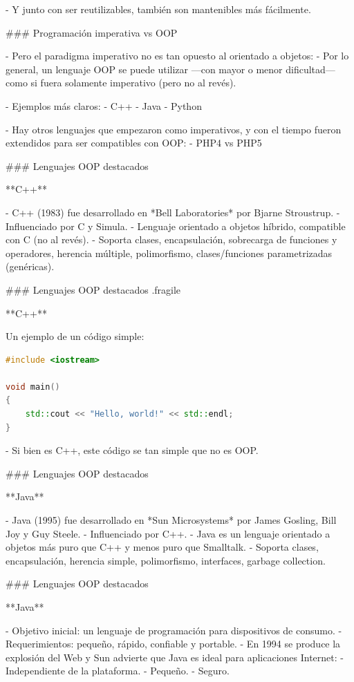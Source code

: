 - Y junto con ser reutilizables, también son mantenibles más fácilmente.

### Programación imperativa vs OOP

- Pero el paradigma imperativo no es tan opuesto al orientado a objetos:
    - Por lo general, un lenguaje OOP se puede utilizar ---con mayor o menor dificultad--- como
    si fuera solamente imperativo (pero no al revés).

- Ejemplos más claros:
    - C++
    - Java
    - Python

- Hay otros lenguajes que empezaron como imperativos, y con el tiempo fueron extendidos
para ser compatibles con OOP:
    - PHP4 vs PHP5

### Lenguajes OOP destacados

**C++**

- C++ (1983) fue desarrollado en *Bell Laboratories* por Bjarne Stroustrup.
- Influenciado por C y Simula.
- Lenguaje orientado a objetos híbrido, compatible con C (no al revés).
- Soporta clases, encapsulación, sobrecarga de funciones y operadores, herencia múltiple, polimorfismo, clases/funciones parametrizadas (genéricas).


### Lenguajes OOP destacados {.fragile}

**C++**\vfill

Un ejemplo de un código simple:
\begin{lstlisting}[language=C++]
#include <iostream>

void main()
{
    std::cout << "Hello, world!" << std::endl;
}
\end{lstlisting}

- Si bien es C++, este código se tan simple que no es OOP.

### Lenguajes OOP destacados

**Java**

- Java (1995) fue desarrollado en *Sun Microsystems* por James Gosling, Bill Joy y Guy Steele.
- Influenciado por C++.
- Java es un lenguaje orientado a objetos más puro que C++ y menos puro que Smalltalk.
- Soporta clases, encapsulación, herencia simple, polimorfismo, interfaces, garbage collection.

### Lenguajes OOP destacados

**Java**

- Objetivo inicial: un lenguaje de programación para dispositivos de consumo.
- Requerimientos: pequeño, rápido, confiable y portable.
- En 1994 se produce la explosión del Web y Sun advierte que Java es ideal para aplicaciones Internet:
    - Independiente de la plataforma.
    - Pequeño.
    - Seguro.

